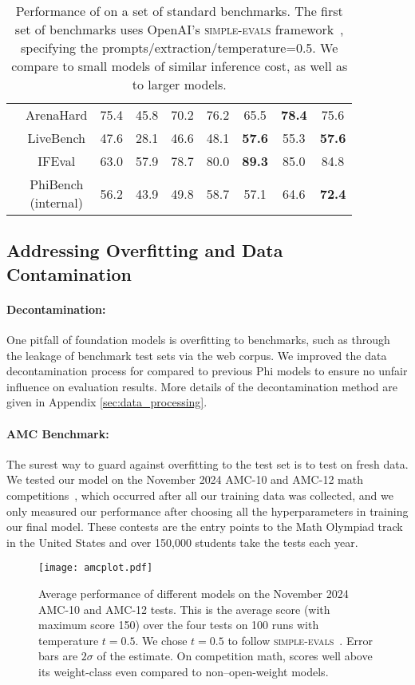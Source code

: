 \begin{table}[t!]
\begin{tabular}{@{}cc cccc ccc@{}}
 & ArenaHard &75.4 &45.8 &70.2 & 76.2 &65.5 &\textbf{78.4} &75.6 \\
 & LiveBench &47.6 &28.1 &46.6 &48.1 &\textbf{57.6} & 55.3 &\textbf{57.6}\\
 & IFEval &63.0 &57.9 &78.7 &80.0 &\textbf{89.3} & 85.0 &84.8\\
\midrule
 & \makecell{PhiBench\\(internal)} &56.2 &43.9 &49.8 &58.7 &57.1 &64.6 & \textbf{72.4}\\
\bottomrule
\end{tabular}
\caption{Performance of \model{} on a set of standard benchmarks. The first set of benchmarks uses OpenAI's \textsc{simple-evals} framework~\cite{simple-evals}, specifying the prompts/extraction/temperature=0.5. We compare to small models of similar inference cost, as well as to larger models.
}
\label{tbl:benchmarks}
\end{table}

\subsection{Addressing Overfitting and Data Contamination}

\paragraph{Decontamination:}
One pitfall of foundation models is overfitting to benchmarks, such as through the leakage of benchmark test sets via the web corpus.  We improved the data decontamination process for \model compared to previous Phi models to ensure no unfair influence on evaluation results. More details of the decontamination method are given in Appendix \ref{sec:data_processing}.

\paragraph{AMC Benchmark:}  
The surest way to guard against overfitting to the test set is to test on fresh data. We tested our model on the November 2024 AMC-10 and AMC-12 math competitions~\cite{amc}, which occurred after all our training data was collected, and we only measured our performance after choosing all the hyperparameters in training our final model.  These contests are the entry points to the Math Olympiad track in the United States and over 150,000 students take the tests each year. 

\begin{figure}
    \centering
    \texttt{[image: amcplot.pdf]}
    \caption{Average performance of different models on the November 2024 AMC-10 and AMC-12 tests.  This is the average score (with maximum score 150) over the four tests on 100 runs with temperature $t=0.5$. We chose $t = 0.5$ to follow \textsc{simple-evals}~\cite{simple-evals}.  Error bars are $2\sigma$ of the estimate.  On competition math, \model scores well above its weight-class even compared to non--open-weight models.}
    \label{fig:AMC}
\end{figure}

